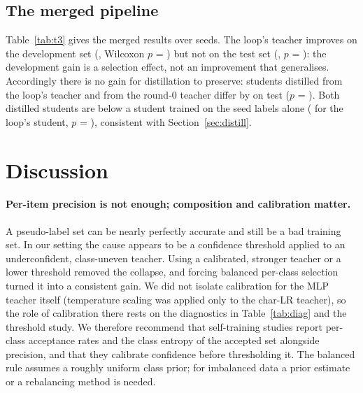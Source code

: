 \begin{table}[t]
\centering\small
\caption{Single-article latency on one CPU thread (median over 200 test articles).}\label{tab:lat}

\end{table}

\subsection{The merged pipeline}
Table~\ref{tab:t3} gives the merged results over \mergedN{} seeds. The loop's teacher improves on the development set (\mergedGainTeacherDev{}, Wilcoxon $p$ = \mergedPTeacherDev) but not on the test set (\mergedGainTeacherTest{}, $p$ = \mergedPTeacherTest): the development gain is a selection effect, not an improvement that generalises. Accordingly there is no gain for distillation to preserve: students distilled from the loop's teacher and from the round-0 teacher differ by \mergedGainStudentTest{} on test ($p$ = \mergedPStudentTest). Both distilled students are below a student trained on the seed labels alone (\mergedDistVsSeedHard{} for the loop's student, $p$ = \mergedPDistVsSeedHard), consistent with Section~\ref{sec:distill}.

\begin{table}[t]
\centering\small
\caption{Merged pipeline, \mergedN{} paired seeds. ``(ref.)'' rows use all gold labels and are upper references, not comparable under the same label budget.}\label{tab:t3}

\end{table}

\section{Discussion}
\paragraph{Per-item precision is not enough; composition and calibration matter.} A pseudo-label set can be nearly perfectly accurate and still be a bad training set. In our setting the cause appears to be a confidence threshold applied to an underconfident, class-uneven teacher. Using a calibrated, stronger teacher or a lower threshold removed the collapse, and forcing balanced per-class selection turned it into a consistent gain. We did not isolate calibration for the MLP teacher itself (temperature scaling was applied only to the char-LR teacher), so the role of calibration there rests on the diagnostics in Table~\ref{tab:diag} and the threshold study. We therefore recommend that self-training studies report per-class acceptance rates and the class entropy of the accepted set alongside precision, and that they calibrate confidence before thresholding it. The balanced rule assumes a roughly uniform class prior; for imbalanced data a prior estimate or a rebalancing method \citep{wei2021crest,wang2022debiased} is needed.

